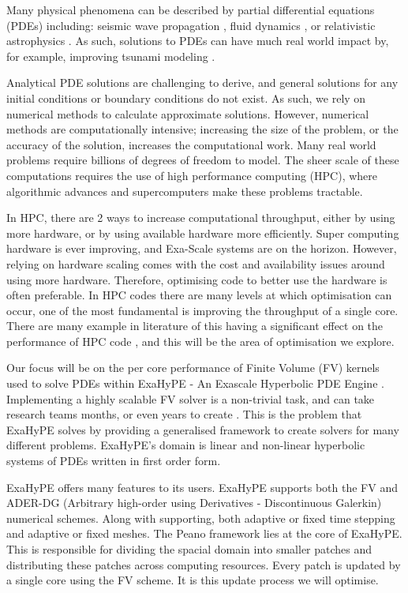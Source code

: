 Many physical phenomena can be described by partial differential equations (PDEs) including:  seismic wave propagation \cite{earthquakePDE}, fluid dynamics \cite{exahype}, or relativistic astrophysics \cite{relativisticPDE}.
As such, solutions to PDEs can have much real world impact by, for example, improving tsunami modeling \cite{tsunamiPDE}.


Analytical PDE solutions are challenging to derive, and general solutions for any initial conditions or boundary conditions do not exist.
As such, we rely on numerical methods to calculate approximate solutions.
However, numerical methods are computationally intensive; increasing the size of the problem, or the accuracy of the solution, increases the computational work.
Many real world problems require billions of degrees of freedom to model.
The sheer scale of these computations requires the use of high performance computing (HPC), where algorithmic advances and supercomputers make these problems tractable.

In HPC, there are 2 ways to increase computational throughput, either by using more hardware, or by using available hardware more efficiently.
Super computing hardware is ever improving, and Exa-Scale systems are on the horizon.
However, relying on hardware scaling comes with the cost and availability issues around using more hardware.
Therefore, optimising code to better use the hardware is often preferable.
In HPC codes there are many levels at which optimisation can occur, one of the most fundamental is improving the throughput of a single core.
There are many example in literature of this having a significant effect on the performance of HPC code \cite{YATeTo,seisolPFLOP,codegen_dg_SIMD}, and this will be the area of optimisation we explore.     

Our focus will be on the per core performance of Finite Volume (FV) kernels used to solve PDEs within ExaHyPE - An Exascale Hyperbolic PDE Engine \cite{exahype}.
Implementing a highly scalable FV solver is a non-trivial task, and can take research teams months, or even years to create \cite{tensorChemistry}.
This is the problem that ExaHyPE solves by providing a generalised framework to create solvers for many different problems.
ExaHyPE's domain is linear and non-linear hyperbolic systems of PDEs written in first order form.

ExaHyPE offers many features to its users.
ExaHyPE supports both the FV and ADER-DG (Arbitrary high-order using Derivatives - Discontinuous Galerkin) numerical schemes.
Along with supporting, both adaptive or fixed time stepping and adaptive or fixed meshes.
The Peano framework \cite{PeanoFramework} lies at the core of ExaHyPE.
This is responsible for dividing the spacial domain into smaller patches and distributing these patches across computing resources.
Every patch is updated by a single core using the FV scheme.
It is this update process we will optimise.

